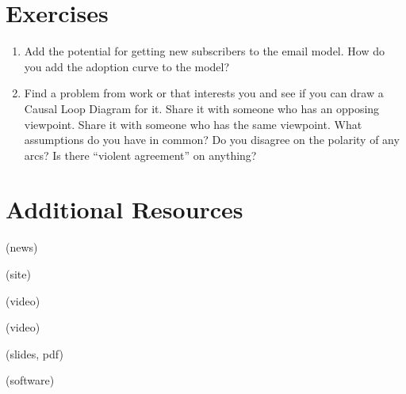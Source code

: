 \documentclass[letterpaper,10pt,english]{sphinxmanual}
\begin{document}
\section{Exercises}
\label{\detokenize{index:Exercises}}\begin{enumerate}
\def\theenumi{\arabic{enumi}}
\def\labelenumi{\theenumi .}
\makeatletter\def\p@enumii{\p@enumi \theenumi .}\makeatother
\item {} 
Add the potential for getting new subscribers to the email model. How do you add the adoption curve to the model?

\item {} 
Find a problem from work or that interests you and see if you can draw a Causal Loop Diagram for it. Share it with someone who has an opposing viewpoint. Share it with someone who has the same viewpoint. What assumptions do you have in common? Do you disagree on the polarity of any arcs? Is there “violent agreement” on anything?

\end{enumerate}


\section{Additional Resources}
\label{\detokenize{index:Additional-Resources}}
 (news)

 (site)

 (video)

 (video)

 (slides, pdf)

 (software)



\renewcommand{\indexname}{Index}
\printindex
\end{document}
